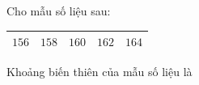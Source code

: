 \begin{ex}
Cho mẫu số liệu sau:
\begin{center}
\begin{tabular}{|c|c|c|c|c|}\hline
$156$ & $158$ & $160$ & $162$ & $164$\\\hline
\end{tabular}
\end{center}
Khoảng biến thiên của mẫu số liệu là
\end{ex}
